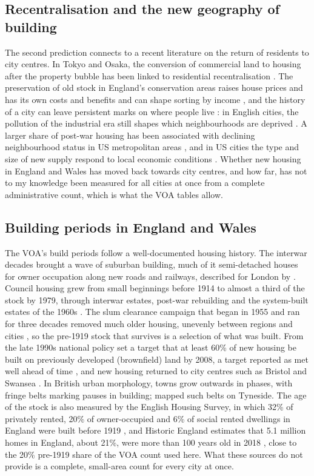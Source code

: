 \documentclass[11pt,a4paper]{article}
\begin{document}
\subsection{Recentralisation and the new geography of building}
The second prediction connects to a recent literature on the return of residents to city centres. In Tokyo and Osaka, the conversion of commercial land to housing after the property bubble has been linked to residential recentralisation \citep{xu2023}. The preservation of old stock in England's conservation areas raises house prices and has its own costs and benefits \citep{waights2019} and can shape sorting by income \citep{vanduijn2021}, and the history of a city can leave persistent marks on where people live \citep{hanlon2022}: in English cities, the pollution of the industrial era still shapes which neighbourhoods are deprived \citep{heblich2021}. A larger share of post-war housing has been associated with declining neighbourhood status in US metropolitan areas \citep{rolheiser2021}, and in US cities the type and size of new supply respond to local economic conditions \citep{hilber2021}. Whether new housing in England and Wales has moved back towards city centres, and how far, has not to my knowledge been measured for all cities at once from a complete administrative count, which is what the VOA tables allow.

\subsection{Building periods in England and Wales}
The VOA's build periods follow a well-documented housing history. The interwar decades brought a wave of suburban building, much of it semi-detached houses for owner occupation along new roads and railways, described for London by \citet{jackson1973}. Council housing grew from small beginnings before 1914 to almost a third of the stock by 1979, through interwar estates, post-war rebuilding and the system-built estates of the 1960s \citep{boughton2018}. The slum clearance campaign that began in 1955 and ran for three decades removed much older housing, unevenly between regions and cities \citep{yelling2000}, so the pre-1919 stock that survives is a selection of what was built. From the late 1990s national policy set a target that at least 60\% of new housing be built on previously developed (brownfield) land by 2008, a target reported as met well ahead of time \citep{wong2010}, and new housing returned to city centres such as Bristol and Swansea \citep{bromley2005}. In British urban morphology, towns grow outwards in phases, with fringe belts marking pauses in building; \citet{whitehand1967} mapped such belts on Tyneside. The age of the stock is also measured by the English Housing Survey, in which 32\% of privately rented, 20\% of owner-occupied and 6\% of social rented dwellings in England were built before 1919 \citep{ehs2025}, and Historic England estimates that 5.1 million homes in England, about 21\%, were more than 100 years old in 2018 \citep{historicengland2019}, close to the 20\% pre-1919 share of the VOA count used here. What these sources do not provide is a complete, small-area count for every city at once.
\end{document}
